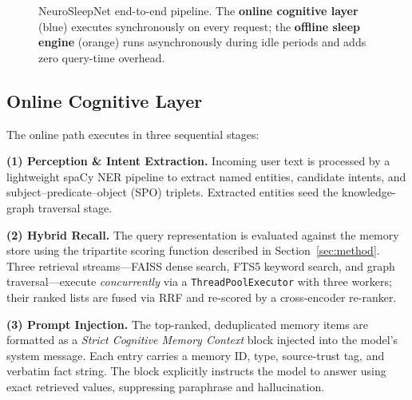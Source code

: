 \documentclass[conference]{IEEEtran}
\begin{document}
\begin{figure}[t]
{%
}
\caption{NeuroSleepNet end-to-end pipeline.  The \textcolor{blue!70}{\textbf{online
cognitive layer}} (blue) executes synchronously on every request; the
\textcolor{orange!70}{\textbf{offline sleep engine}} (orange) runs
asynchronously during idle periods and adds zero query-time overhead.}
\label{fig:arch}
\end{figure}

\subsection{Online Cognitive Layer}
The online path executes in three sequential stages:

\textbf{(1) Perception \& Intent Extraction.}
Incoming user text is processed by a lightweight spaCy NER pipeline to extract
named entities, candidate intents, and subject--predicate--object (SPO)
triplets.  Extracted entities seed the knowledge-graph traversal stage.

\textbf{(2) Hybrid Recall.}
The query representation is evaluated against the memory store using the
tripartite scoring function described in Section~\ref{sec:method}.  Three
retrieval streams---FAISS dense search, FTS5 keyword search, and graph
traversal---execute \emph{concurrently} via a \texttt{ThreadPoolExecutor}
with three workers; their ranked lists are fused via RRF and re-scored by a
cross-encoder re-ranker.

\textbf{(3) Prompt Injection.}
The top-ranked, deduplicated memory items are formatted as a
\emph{Strict Cognitive Memory Context} block injected into the model's system
message.  Each entry carries a memory ID, type, source-trust tag, and verbatim
fact string.  The block explicitly instructs the model to answer using exact
retrieved values, suppressing paraphrase and hallucination.
\end{document}
